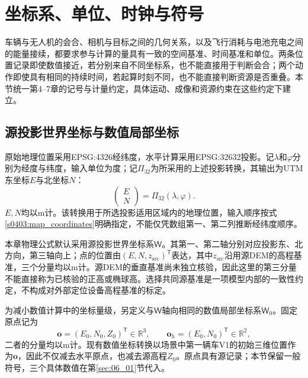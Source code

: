\section{坐标系、单位、时钟与符号}
\label{sec:04_03}

车辆与无人机的会合、相机与目标之间的几何关系，以及飞行消耗与电池充电之间的能量接续，都要求参与计算的量具有一致的空间基准、时间基准和单位。两条位置记录即使数值接近，若分别来自不同坐标系，也不能直接用于判断会合；两个动作即使具有相同的持续时间，若起算时刻不同，也不能直接判断资源是否重叠。本节统一第4--7章的记号与计量约定，具体运动、成像和资源约束在这些约定下建立。

\subsection{源投影世界坐标与数值局部坐标}

原始地理位置采用EPSG:4326经纬度，水平计算采用EPSG:32632投影。记$\lambda$和$\varphi$分别为经度与纬度，输入单位为度；记$\Pi_{32}$为所采用的上述投影转换，其输出为UTM东坐标$E$与北坐标$N$：
\begin{equation}
 \begin{pmatrix}E\\N\end{pmatrix}
 =\Pi_{32}(\lambda,\varphi).
 \label{s0403:map_coordinates}
\end{equation}
$E,N$均以$\mathrm m$计。该转换用于所选投影适用区域内的地理位置，输入顺序按式\eqref{s0403:map_coordinates}明确指定，不能仅凭数组第一、第二列推断经纬度顺序。

本章物理公式默认采用源投影世界坐标系$\mathsf W$。其第一、第二轴分别对应投影东、北方向，第三轴向上；点的位置由$(E,N,z_{\mathrm{src}})^{\mathsf T}$表达，其中$z_{\mathrm{src}}$沿用源DEM的高程基准，三个分量均以$\mathrm m$计。源DEM的垂直基准尚未独立核验，因此这里的第三分量不能直接称为已核验的正高或椭球高。选择共同源基准是一项模型内部的一致性约定，不构成对外部定位设备高程基准的标定。

为减小数值计算中的坐标量级，另定义与$\mathsf W$轴向相同的数值局部坐标系$\mathsf W_0$。固定原点记为
\begin{equation}
 \mathbf o=(E_0,N_0,Z_0)^{\mathsf T}\in\mathbb R^3,
 \qquad
 \mathbf o_h=(E_0,N_0)^{\mathsf T}\in\mathbb R^2,
 \label{s0403:fixed_origin}
\end{equation}
二者的分量均以$\mathrm m$计。现有数值坐标转换以场景中第一辆车V1的初始三维位置作为$\mathbf o$，因此不仅减去水平原点，也减去源高程$Z_0$。原点具有源记录；本节保留一般符号，三个具体数值在第\ref{sec:06_01}节代入。


